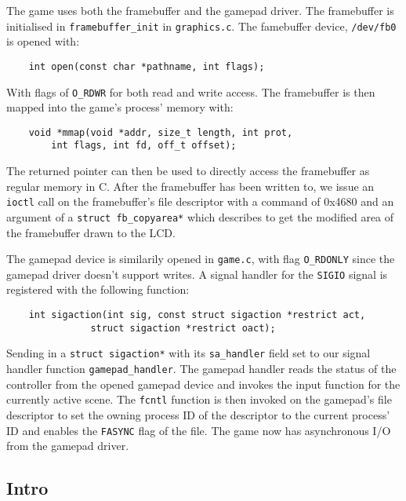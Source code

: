 The game uses both the framebuffer and the gamepad driver. The framebuffer is
initialised in \texttt{framebuffer\_init} in \texttt{graphics.c}. The famebuffer
device, \texttt{/dev/fb0} is opened with:

\begin{lstlisting}
	int open(const char *pathname, int flags);
\end{lstlisting}

With flags of \texttt{O\_RDWR} for both read and write access. The framebuffer
is then mapped into the game's process' memory with:

\begin{lstlisting}
	void *mmap(void *addr, size_t length, int prot,
		int flags, int fd, off_t offset);
\end{lstlisting}

The returned pointer can then be used to directly access the framebuffer as
regular memory in C. After the framebuffer has been written to, we issue an
\texttt{ioctl} call on the framebuffer's file descriptor with a command of
0x4680 and an argument of a \texttt{struct fb\_copyarea*} which describes to get
the modified area of the framebuffer drawn to the LCD.

The gamepad device is similarily opened in \texttt{game.c}, with flag
\texttt{O\_RDONLY} since the gamepad driver doesn't support writes. A signal
handler for the \texttt{SIGIO} signal is registered with the following function:

\begin{lstlisting}
	int sigaction(int sig, const struct sigaction *restrict act,
	           struct sigaction *restrict oact);
\end{lstlisting}

Sending in a \texttt{struct sigaction*} with its \texttt{sa\_handler} field set
to our signal handler function \texttt{gamepad\_handler}. The gamepad handler
reads the status of the controller from the opened gamepad device and invokes
the input function for the currently active scene. The \texttt{fcntl} function
is then invoked on the gamepad's file descriptor to set the owning process ID of
the descriptor to the current process' ID and enables the \texttt{FASYNC} flag
of the file. The game now has asynchronous I/O from the gamepad driver.

\subsection{Intro}

